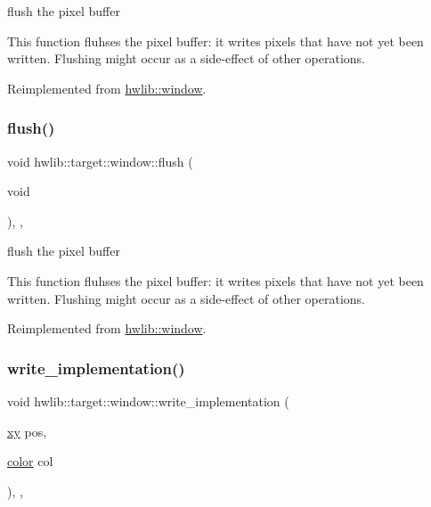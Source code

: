 flush the pixel buffer 

This function fluhses the pixel buffer\+: it writes pixels that have not yet been written. Flushing might occur as a side-\/effect of other operations. 

Reimplemented from \hyperlink{classhwlib_1_1window_a2b654a98872d174173e1df24a444c949}{hwlib\+::window}.

\mbox{\label{classhwlib_1_1target_1_1window_a00ef1d2bba8684306ee8051fbf469900}} 
\subsubsection{\texorpdfstring{flush()}{flush()}\hspace{0.1cm}{\footnotesize\ttfamily [2/2]}}
{\footnotesize\ttfamily void hwlib\+::target\+::window\+::flush (\begin{DoxyParamCaption}\item[{void}]{ }\end{DoxyParamCaption})\hspace{0.3cm}{\ttfamily [inline]}, {\ttfamily [override]}, {\ttfamily [virtual]}}



flush the pixel buffer 

This function fluhses the pixel buffer\+: it writes pixels that have not yet been written. Flushing might occur as a side-\/effect of other operations. 

Reimplemented from \hyperlink{classhwlib_1_1window_a2b654a98872d174173e1df24a444c949}{hwlib\+::window}.

\mbox{\label{classhwlib_1_1target_1_1window_ae432e3dc481e789f5d972331eb1f6725}} 
\subsubsection{\texorpdfstring{write\+\_\+implementation()}{write\_implementation()}\hspace{0.1cm}{\footnotesize\ttfamily [1/2]}}
{\footnotesize\ttfamily void hwlib\+::target\+::window\+::write\+\_\+implementation (\begin{DoxyParamCaption}\item[{\hyperlink{classhwlib_1_1xy}{xy}}]{pos,  }\item[{\hyperlink{classhwlib_1_1color}{color}}]{col }\end{DoxyParamCaption})\hspace{0.3cm}{\ttfamily [inline]}, {\ttfamily [override]}, {\ttfamily [virtual]}}

